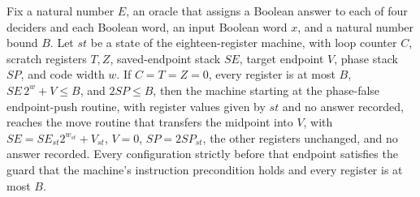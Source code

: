 \begin{theorem}
\label{Complexity.LogProg.SavitchARM.pushV_run}
\leanok
{}
Fix a natural number $E$, an oracle that assigns a Boolean answer to each of four
deciders and each Boolean word, an input Boolean word $x$, and a natural number bound
$B$. Let $st$ be a state of the eighteen-register machine, with loop counter $C$,
scratch registers $T,Z$, saved-endpoint stack $SE$, target endpoint $V$, phase stack
$SP$, and code width $w$. If $C=T=Z=0$, every register is at most $B$, $SE\,2^w+V\le B$,
and $2SP\le B$, then the machine starting at the phase-false endpoint-push routine, with
register values given by $st$ and no answer recorded, reaches the move routine that
transfers the midpoint into $V$, with $SE=SE_{st}2^{w_{st}}+V_{st}$, $V=0$,
$SP=2SP_{st}$, the other registers unchanged, and no answer recorded. Every
configuration strictly before that endpoint satisfies the guard that the machine’s
instruction precondition holds and every register is at most $B$.
\end{theorem}

